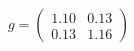 \documentclass[preview]{standalone}
\begin{document}
\begin{align*}
g = \begin{pmatrix} 1.10 & 0.13 \\ 0.13 & 1.16 \end{pmatrix}
\end{align*}
\end{document}
